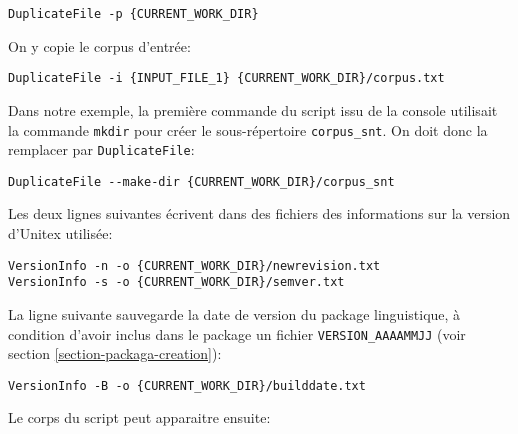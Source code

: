 \begin{Verbatim}[fontsize=\small,fontfamily=helvetica]
DuplicateFile -p {CURRENT_WORK_DIR}
\end{Verbatim}

\noindent On y copie le corpus d’entrée:

\begin{Verbatim}[fontsize=\small,fontfamily=helvetica]
DuplicateFile -i {INPUT_FILE_1} {CURRENT_WORK_DIR}/corpus.txt
\end{Verbatim}

\noindent Dans notre exemple, la première commande du script issu de la console utilisait la commande
\verb$mkdir$ pour créer le sous-répertoire \verb$corpus_snt$. On doit donc la remplacer par
\verb$DuplicateFile$:

\begin{Verbatim}[fontsize=\small,fontfamily=helvetica]
DuplicateFile --make-dir {CURRENT_WORK_DIR}/corpus_snt
\end{Verbatim}

\noindent Les deux lignes suivantes écrivent dans des fichiers des informations sur la version d'Unitex
utilisée:


\begin{Verbatim}[fontsize=\small,fontfamily=helvetica]
VersionInfo -n -o {CURRENT_WORK_DIR}/newrevision.txt
VersionInfo -s -o {CURRENT_WORK_DIR}/semver.txt
\end{Verbatim}

\noindent La ligne suivante sauvegarde la date de version du package linguistique, à condition d'avoir
inclus dans le package un fichier \verb$VERSION_AAAAMMJJ$ (voir section \ref{section-packaga-creation}):

\begin{Verbatim}[fontsize=\small,fontfamily=helvetica]
VersionInfo -B -o {CURRENT_WORK_DIR}/builddate.txt
\end{Verbatim}

\noindent Le corps du script peut apparaitre ensuite:

